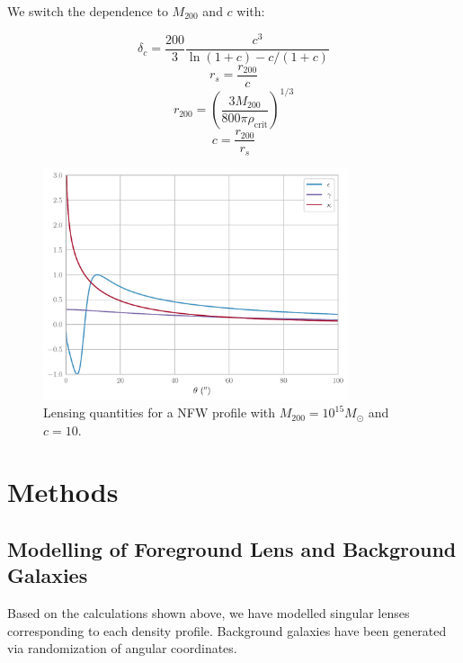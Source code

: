 \documentclass[10pt]{article}
\begin{document}
We switch the dependence to $M_{200}$ and $c$ with:

\begin{equation}
\delta_c = \frac{200}{3} \frac{c^3}{\ln(1 + c) - c/(1 + c)}
\end{equation}
\begin{equation}
r_s = \frac{r_{200}}{c}
\end{equation}
\begin{equation}
r_{200} = \left( \frac{3 M_{200}}{800 \pi \rho_\mathrm{crit}} \right)^{1/3}
\end{equation}
\begin{equation}
c = \frac{r_{200}}{r_s}
\end{equation}

\begin{figure}
    \centering
    \includegraphics[width=0.8\textwidth]{nfwproperties.pdf}
    \caption{Lensing quantities for a NFW profile with $M_{200} = 10^{15} M_\odot$ and $c = 10$.}
    \label{}
\end{figure}




\section{Methods}

\subsection{Modelling of Foreground Lens and Background Galaxies}
Based on the calculations shown above, we have modelled singular lenses corresponding to each density profile.
 Background galaxies have been generated via randomization of angular coordinates.
\end{document}
